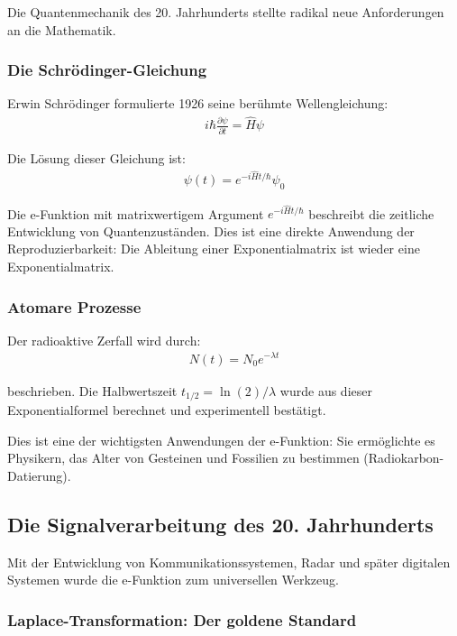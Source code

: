 \documentclass[a4paper,12pt,twoside]{report}
\theoremstyle{definition}
\begin{document}
Die Quantenmechanik des 20. Jahrhunderts stellte radikal neue Anforderungen an die Mathematik.

\subsubsection*{Die Schrödinger-Gleichung}

Erwin Schrödinger formulierte 1926 seine berühmte Wellengleichung:
\begin{align}
	i\hbar \frac{\partial \psi}{\partial t} = \hat{H} \psi
\end{align}

Die Lösung dieser Gleichung ist:
\begin{align}
	\psi(t) = e^{-i\hat{H}t/\hbar} \psi_0
\end{align}

Die e-Funktion mit matrixwertigem Argument $e^{-i\hat{H}t/\hbar}$ beschreibt die zeitliche Entwicklung von Quantenzuständen. Dies ist eine direkte Anwendung der Reproduzierbarkeit: Die Ableitung einer Exponentialmatrix ist wieder eine Exponentialmatrix.

\subsubsection*{Atomare Prozesse}

Der radioaktive Zerfall wird durch:
\begin{align}
	N(t) = N_0 e^{-\lambda t}
\end{align}

beschrieben. Die Halbwertszeit $t_{1/2} = \ln(2)/\lambda$ wurde aus dieser Exponentialformel berechnet und experimentell bestätigt.

Dies ist eine der wichtigsten Anwendungen der e-Funktion: Sie ermöglichte es Physikern, das Alter von Gesteinen und Fossilien zu bestimmen (Radiokarbon-Datierung).

\subsection{Die Signalverarbeitung des 20. Jahrhunderts}

Mit der Entwicklung von Kommunikationssystemen, Radar und später digitalen Systemen wurde die e-Funktion zum universellen Werkzeug.

\subsubsection*{Laplace-Transformation: Der goldene Standard}
\end{document}
